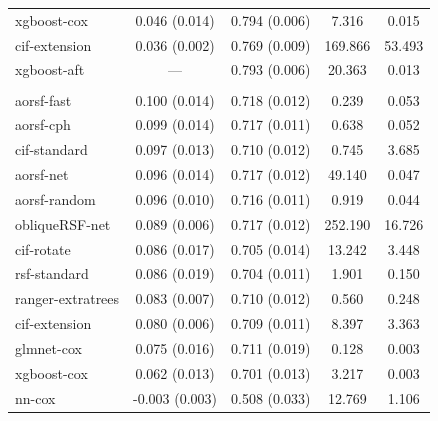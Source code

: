 \documentclass{article}\usepackage[]{graphicx}\usepackage[]{xcolor}
\newenvironment{knitrout}{}{} %
\begin{document}
\begin{knitrout}
\begin{longtable}[t]{lcccc}
\hspace{1em}xgboost-cox & 0.046 (0.014) & 0.794 (0.006) & 7.316 & 0.015\\
\hspace{1em}cif-extension & 0.036 (0.002) & 0.769 (0.009) & 169.866 & 53.493\\
\hspace{1em}xgboost-aft & --- & 0.793 (0.006) & 20.363 & 0.013\\
\addlinespace[0.3em]
\multicolumn{5}{l}{\textit{\textbf{Colon cancer; death, n = 929, p = 12}}}\\
\hline
\hspace{1em}aorsf-fast & 0.100 (0.014) & 0.718 (0.012) & 0.239 & 0.053\\
\hspace{1em}aorsf-cph & 0.099 (0.014) & 0.717 (0.011) & 0.638 & 0.052\\
\hspace{1em}cif-standard & 0.097 (0.013) & 0.710 (0.012) & 0.745 & 3.685\\
\hspace{1em}aorsf-net & 0.096 (0.014) & 0.717 (0.012) & 49.140 & 0.047\\
\hspace{1em}aorsf-random & 0.096 (0.010) & 0.716 (0.011) & 0.919 & 0.044\\
\hspace{1em}obliqueRSF-net & 0.089 (0.006) & 0.717 (0.012) & 252.190 & 16.726\\
\hspace{1em}cif-rotate & 0.086 (0.017) & 0.705 (0.014) & 13.242 & 3.448\\
\hspace{1em}rsf-standard & 0.086 (0.019) & 0.704 (0.011) & 1.901 & 0.150\\
\hspace{1em}ranger-extratrees & 0.083 (0.007) & 0.710 (0.012) & 0.560 & 0.248\\
\hspace{1em}cif-extension & 0.080 (0.006) & 0.709 (0.011) & 8.397 & 3.363\\
\hspace{1em}glmnet-cox & 0.075 (0.016) & 0.711 (0.019) & 0.128 & 0.003\\
\hspace{1em}xgboost-cox & 0.062 (0.013) & 0.701 (0.013) & 3.217 & 0.003\\
\hspace{1em}nn-cox & -0.003 (0.003) & 0.508 (0.033) & 12.769 & 1.106\\

\end{longtable}
\end{knitrout}
\end{document}
